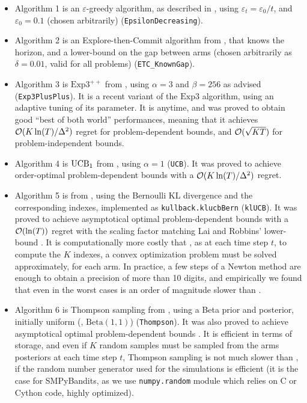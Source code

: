 
\begin{itemize}
    \item Algorithm 1 is
    an $\varepsilon$-greedy algorithm, as described in \cite{Bubeck12}, using $\varepsilon_t = \varepsilon_0 / t$, and $\varepsilon_0 = 0.1$ (chosen arbitrarily) (\texttt{EpsilonDecreasing}).

    \item Algorithm 2 is
    an Explore-then-Commit algorithm from \cite{GarivierETC2016}, that knows the horizon, and a lower-bound on the gap between arms (chosen arbitrarily as $\delta=0.01$, valid for all problems) (\texttt{ETC\_KnownGap}).

    \item Algorithm 3 is
    $\mathrm{Exp}3^{++}$ from \cite{Seldin17}, using $\alpha=3$ and $\beta=256$ as advised (\texttt{Exp3PlusPlus}).
    It is a recent variant of the $\mathrm{Exp3}$ algorithm, using an adaptive tuning of its parameter. It is anytime, and was proved to obtain good ``best of both world'' performances, meaning that it achieves $\mathcal{O}(K\ln(T)/\Delta^2)$ regret for problem-dependent bounds, and $\mathcal{O}(\sqrt{KT})$ for problem-independent bounds.

    \item Algorithm 4 is
    $\mathrm{UCB}_1$ from \cite{Auer02}, using $\alpha=1$ (\texttt{UCB}).
    It was proved to achieve order-optimal problem-dependent bounds with a $\mathcal{O}(K\ln(T)/\Delta^2)$ regret.

    \item Algorithm 5 is
    \klUCB{} from \cite{KLUCBJournal}, using the Bernoulli KL divergence and the corresponding \klUCB{} indexes, implemented as \texttt{kullback.klucbBern} (\texttt{klUCB}).
    It was proved to achieve asymptotical optimal problem-dependent bounds with a $\mathcal{O}(\ln(T))$ regret with the scaling factor matching Lai and Robbins' lower-bound \cite{LaiRobbins85}.
    It is computationally more costly that \UCB, as at each time step $t$, to compute the $K$ indexes, a convex optimization problem must be solved approximately, for each arm.
    In practice, a few steps of a Newton method are enough to obtain a precision of more than 10 digits, and empirically we found that even in the worst cases \klUCB{} is an order of magnitude slower than \UCB.

    \item Algorithm 6 is
    Thompson sampling from \cite{Kaufmann12Thompson}, using a Beta prior and posterior, initially uniform (\ie, $\mathrm{Beta}(1,1)$) (\texttt{Thompson}).
    It was also proved to achieve asymptotical optimal problem-dependent bounds \cite{Kaufmann12Thompson,AgrawalGoyal11}.
    It is efficient in terms of storage, and even if $K$ random samples must be sampled from the arms posteriors at each time step $t$, Thompson sampling is not much slower than \UCB, if the random number generator used for the simulations is efficient (it is the case for SMPyBandits, as we use \texttt{numpy.random} module which relies on C or Cython code, highly optimized).


\end{itemize}
